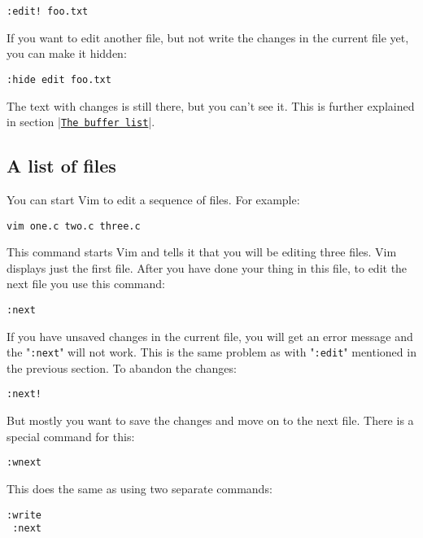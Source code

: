  \begin{Verbatim}[samepage=true]
 :edit! foo.txt
 \end{Verbatim}

If you want to edit another file, but not write the changes in the current file yet, you can make it hidden:

 \begin{Verbatim}[samepage=true]
 :hide edit foo.txt
 \end{Verbatim}

The text with changes is still there, but you can't see it.
This is further explained in section |\hyperref[The buffer list]{\texttt{The buffer list}}|.

\subsection{A list of files}
You can start Vim to edit a sequence of files.  For example:

 \begin{Verbatim}[samepage=true]
 vim one.c two.c three.c
 \end{Verbatim}

This command starts Vim and tells it that you will be editing three files.
Vim displays just the first file.
After you have done your thing in this file, to edit the next file you use this command:

 \begin{Verbatim}[samepage=true]
 :next
 \end{Verbatim}

If you have unsaved changes in the current file, you will get an error message and the "\texttt{:next}" will not work.
This is the same problem as with "\texttt{:edit}" mentioned in the previous section.
To abandon the changes:

 \begin{Verbatim}[samepage=true]
 :next!
 \end{Verbatim}

But mostly you want to save the changes and move on to the next file.
There is a special command for this:

 \begin{Verbatim}[samepage=true]
 :wnext
 \end{Verbatim}

This does the same as using two separate commands:

 \begin{Verbatim}[samepage=true]
 :write
 :next
 \end{Verbatim}

